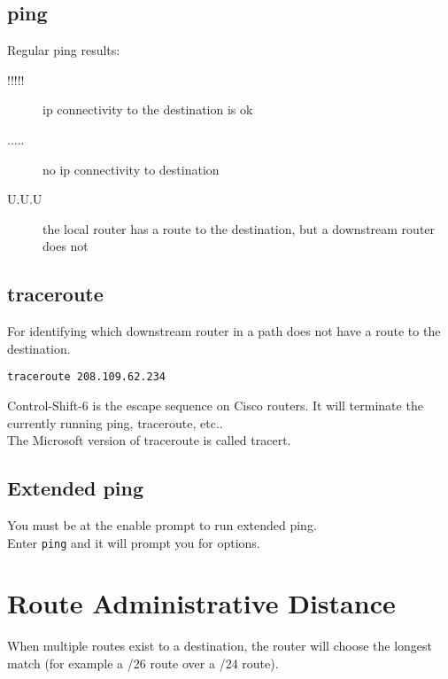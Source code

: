\documentclass{article}
\begin{document}
\subsection{ping}

Regular ping results:

\begin{description}

\item[!!!!!]
ip connectivity to the destination is ok

\item[.....]
no ip connectivity to destination

\item[U.U.U]
the local router has a route to the destination, but a downstream router does
not

\end{description}

\subsection{traceroute}

For identifying which downstream router in a path does not have a route to
the destination.

\begin{verbatim}
traceroute 208.109.62.234
\end{verbatim}

Control-Shift-6 is the escape sequence on Cisco routers. It will terminate
the currently running ping, traceroute, etc..\\

The Microsoft version of traceroute is called tracert.

\subsection{Extended ping}

You must be at the enable prompt to run extended ping.\\

Enter \texttt{ping} and it will prompt you for options.

\section{Route Administrative Distance}

When multiple routes exist to a destination, the router will choose the
longest match (for example a /26 route over a /24 route).\\
\end{document}
